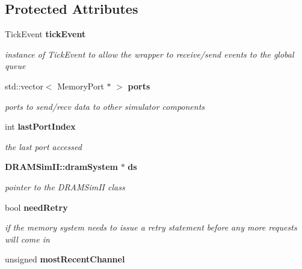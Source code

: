\subsection*{Protected Attributes}
\begin{CompactItemize}
\item 
TickEvent {\bf tickEvent}\label{class_m5dram_system_2c1df40ac4ba1b6ee79a89c36717e6b5}

\begin{CompactList}\small\item\em instance of TickEvent to allow the wrapper to receive/send events to the global queue \item\end{CompactList}\item 
std::vector$<$ MemoryPort $\ast$ $>$ {\bf ports}\label{class_m5dram_system_c74ac86e7c7390068a33e60dfb352427}

\begin{CompactList}\small\item\em ports to send/recv data to other simulator components \item\end{CompactList}\item 
int {\bf lastPortIndex}\label{class_m5dram_system_8dec460f8036d2885f730687e207624c}

\begin{CompactList}\small\item\em the last port accessed \item\end{CompactList}\item 
{\bf DRAMSimII::dramSystem} $\ast$ {\bf ds}\label{class_m5dram_system_229ff297f8ab207f6d122a13fa2ecc6a}

\begin{CompactList}\small\item\em pointer to the DRAMSimII class \item\end{CompactList}\item 
bool {\bf needRetry}\label{class_m5dram_system_b1c16d57a7d7a3a07c8c0250be821432}

\begin{CompactList}\small\item\em if the memory system needs to issue a retry statement before any more requests will come in \item\end{CompactList}\item 
unsigned {\bf mostRecentChannel}\label{class_m5dram_system_8f2613214d10b04b640bc26db979484b}


\end{CompactItemize}
